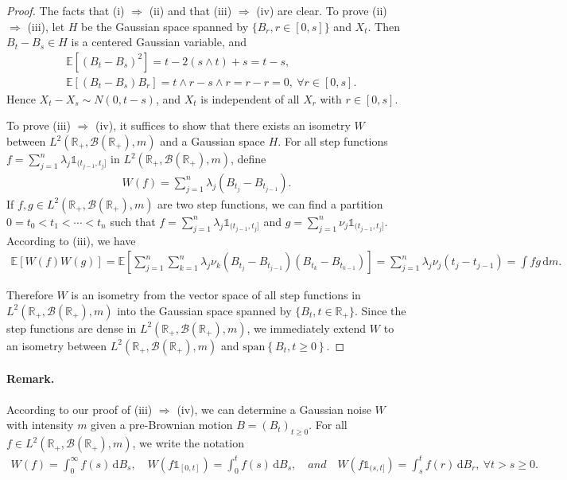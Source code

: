 \documentclass{article}
\numberwithin{equation}{section}
\newcommand{\E}{\mathbb{E}}
\renewcommand{\d}{\mathrm{d}}
\theoremstyle{plain}
\theoremstyle{definition}
\begin{document}
\begin{proof}
The facts that (i) $\Rightarrow$ (ii) and that (iii) $\Rightarrow$ (iv) are clear. To prove (ii) $\Rightarrow$ (iii), let $H$ be the Gaussian space spanned by $\{B_r,r\in[0,s]\}$ and $X_t$. Then $B_t-B_s\in H$ is a centered Gaussian variable, and
\begin{align*}
	&\E\left[(B_t-B_s)^2\right] = t - 2 (s\wedge t) + s = t-s,\\
	&\E\left[(B_t-B_s)B_r\right] = t\wedge r - s\wedge r = r-r=0,\ \forall r\in[0,s].
\end{align*} 
Hence $X_t-X_s\sim N(0,t-s)$, and $X_t$ is independent of all $X_r$ with $r\in[0,s]$.

To prove (iii) $\Rightarrow$ (iv), it suffices to show that there exists an isometry $W$ between $L^2(\mathbb{R}_+,\mathscr{B}(\mathbb{R}_+),m)$ and a Gaussian space $H$. For all step functions $f=\sum_{j=1}^n\lambda_j\mathds{1}_{(t_{j-1},t_j]}$ in $L^2(\mathbb{R}_+,\mathscr{B}(\mathbb{R}_+),m)$, define
\begin{align*}
	W(f) = \sum_{j=1}^n\lambda_j(B_{t_j}-B_{t_{j-1}}).
\end{align*}
If $f,g\in L^2(\mathbb{R}_+,\mathscr{B}(\mathbb{R}_+),m)$ are two step functions, we can find a partition $0=t_0<t_1<\cdots<t_n$ such that $f=\sum_{j=1}^n\lambda_j\mathds{1}_{(t_{j-1},t_j]}$ and $g=\sum_{j=1}^n\nu_j\mathds{1}_{(t_{j-1},t_j]}$. According to (iii), we have
\begin{align*}
	\E[W(f)W(g)] = \E\left[\sum_{j=1}^n\sum_{k=1}^n\lambda_j\nu_k(B_{t_j}-B_{t_{j-1}})(B_{t_k}-B_{t_{k-1}})\right] = \sum_{j=1}^n\lambda_j\nu_j(t_j-t_{j-1}) = \int fg\,\d m.
\end{align*}

Therefore $W$ is an isometry from the vector space of all step functions in $L^2(\mathbb{R}_+,\mathscr{B}(\mathbb{R}_+),m)$ into the Gaussian space spanned by $\{B_t,t\in\mathbb{R}_+\}$. Since the step functions are dense in $L^2(\mathbb{R}_+,\mathscr{B}(\mathbb{R}_+),m)$, we immediately extend $W$ to an isometry between $L^2(\mathbb{R}_+,\mathscr{B}(\mathbb{R}_+),m)$ and $\mathrm{span}\left\{B_t,t\geq 0\right\}$.
\end{proof}

\paragraph{Remark.} According to our proof of (iii) $\Rightarrow$ (iv), we can determine a Gaussian noise $W$ with intensity $m$ given a pre-Brownian motion $B=(B_t)_{t\geq 0}$. For all $f\in L^2(\mathbb{R}_+,\mathscr{B}(\mathbb{R}_+),m)$, we write the notation
\begin{align*}
	W(f)=\int_0^\infty f(s)\,\d B_s,\quad W(f\mathds{1}_{[0,t]})=\int_0^t f(s)\,\d B_s,\quad \textit{and}\quad W(f\mathds{1}_{(s,t]})=\int_s^t f(r)\,\d B_r,\ \forall t>s\geq 0.
\end{align*}
\end{document}
